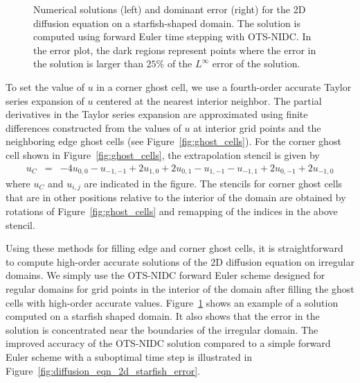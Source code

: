 \documentclass[fleqn,12pt,twoside]{article}
\newcommand{\bea}{\begin{eqnarray}}
\newcommand{\eea}{\end{eqnarray}}
\begin{document}
\begin{figure}[tb]
\begin{center}
\caption{Numerical solutions (left) and dominant error (right) for the 2D 
diffusion equation on a starfish-shaped domain.  The solution is computed 
using forward Euler time stepping with OTS-NIDC.  In the error plot, the dark 
regions represent points where the error in the solution is larger than 
$25$\% of the $L^\infty$ error of the solution.  
}
\label{fig:diffusion_eqn_2d_starfish_domain}
\end{center}
\end{figure}

To set the value of $u$ in a corner ghost cell, we use a fourth-order accurate
Taylor series expansion of $u$ centered at the nearest interior 
neighbor.  The partial derivatives in the Taylor series expansion are 
approximated using finite differences constructed from the values of $u$ 
at interior grid points and the neighboring edge ghost cells (see 
Figure~\ref{fig:ghost_cells}).  For the corner ghost cell shown 
in Figure~\ref{fig:ghost_cells}, the extrapolation stencil is given by
\bea
  u_C &=&  -4 u_{0,0} - u_{-1,-1} + 2 u_{1,0} + 2 u_{0,1}
      - u_{1,-1} - u_{-1,1} + 2 u_{0,-1} + 2 u_{-1,0}
\eea
where $u_C$ and $u_{i,j}$ are indicated in the figure.  The stencils for
corner ghost cells that are in other positions relative to the interior of 
the domain are obtained by rotations of Figure~\ref{fig:ghost_cells} and 
remapping of the indices in the above stencil.

Using these methods for filling edge and corner ghost cells, it is 
straightforward to compute high-order accurate solutions of the 2D diffusion 
equation on irregular domains.  We simply use the OTS-NIDC forward Euler 
scheme designed for regular domains for grid points in the interior of the 
domain after filling the ghost cells with high-order accurate values.  
Figure~\ref{fig:diffusion_eqn_2d_starfish_domain} shows an example of 
a solution computed on a starfish shaped domain.  It also shows that the 
error in the solution is concentrated near the boundaries of the irregular
domain.  The improved accuracy of the OTS-NIDC solution compared to a simple 
forward Euler scheme with a suboptimal time step is illustrated in 
Figure~\ref{fig:diffusion_eqn_2d_starfish_error}. 
\end{document}
